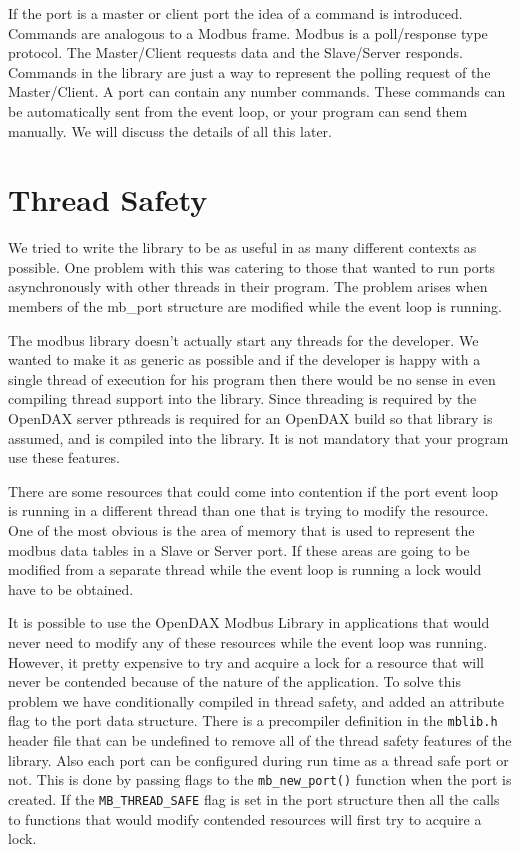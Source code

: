 If the port is a master or client port the idea of a command is introduced.  Commands are analogous to a Modbus frame.  Modbus is a poll/response type protocol.  The Master/Client requests data and the Slave/Server responds.  Commands in the library are just a way to represent the polling request of the Master/Client.  A port can contain any number commands.  These commands can be automatically sent from the event loop, or your program can send them manually.  We will discuss the details of all this later.

\section{Thread Safety}

We tried to write the library to be as useful in as many different contexts as possible.  One problem with this was catering to those that wanted to run ports asynchronously with other threads in their program.  The problem arises when members of the mb\_port structure are modified while the event loop is running.

The modbus library doesn't actually start any threads for the developer.  We wanted to make it as generic as possible and if the developer is happy with a single thread of execution for his program then there would be no sense in even compiling thread support into the library.  Since threading is required by the OpenDAX server pthreads is required for an OpenDAX build so that library is assumed, and is compiled into the library.  It is not mandatory that your program use these features.

There are some resources that could come into contention if the port event loop is running in a different thread than one that is trying to modify the resource. One of the most obvious is the area of memory that is used to represent the modbus data tables in a Slave or Server port.  If these areas are going to be modified from a separate thread while the event loop is running a lock would have to be obtained. 

It is possible to use the OpenDAX Modbus Library in applications that would never need to modify any of these resources while the event loop was running.  However, it  pretty expensive to try and acquire a lock for a resource that will never be contended because of the nature of the application.  To solve this problem we have conditionally compiled in thread safety, and added an attribute flag to the port data structure.  There is a precompiler definition in the \texttt{mblib.h} header file that can be undefined to remove all of the thread safety features of the library.  Also each port can be configured during run time as a thread safe port or not.  This is done by passing flags to the \texttt{mb\_new\_port()} function when the port is created.  If the \texttt{MB\_THREAD\_SAFE} flag is set in the port structure then all the calls to functions that would modify contended resources will first try to acquire a lock.

